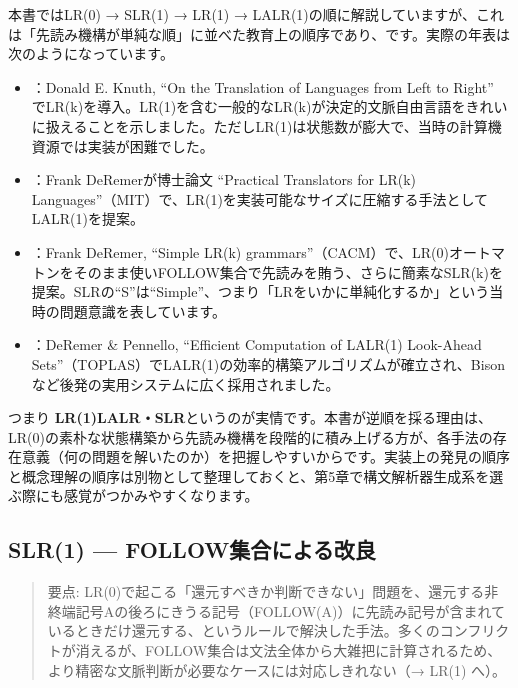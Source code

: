 \begin{tcolorbox}[title=LR系構文解析の歴史]
本書ではLR(0) → SLR(1) → LR(1) → LALR(1)の順に解説していますが、これは「先読み機構が単純な順」に並べた教育上の順序であり、です。実際の年表は次のようになっています。

\begin{itemize}
\item
  \textbf{}：Donald E. Knuth, ``On the Translation of Languages from Left to Right'' でLR(k)を導入。LR(1)を含む一般的なLR(k)が決定的文脈自由言語をきれいに扱えることを示しました。ただしLR(1)は状態数が膨大で、当時の計算機資源では実装が困難でした。
\item
  \textbf{}：Frank DeRemerが博士論文 ``Practical Translators for LR(k) Languages''（MIT）で、LR(1)を実装可能なサイズに圧縮する手法としてLALR(1)を提案。
\item
  \textbf{}：Frank DeRemer, ``Simple LR(k) grammars''（CACM）で、LR(0)オートマトンをそのまま使いFOLLOW集合で先読みを賄う、さらに簡素なSLR(k)を提案。SLRの``S''は``Simple''、つまり「LRをいかに単純化するか」という当時の問題意識を表しています。
\item
  \textbf{}：DeRemer \& Pennello, ``Efficient Computation of LALR(1) Look-Ahead Sets''（TOPLAS）でLALR(1)の効率的構築アルゴリズムが確立され、Bisonなど後発の実用システムに広く採用されました。
\end{itemize}

つまり \textbf{\sffamily LR(1)}\textbf{\sffamily LALR・SLR}というのが実情です。本書が逆順を採る理由は、LR(0)の素朴な状態構築から先読み機構を段階的に積み上げる方が、各手法の存在意義（何の問題を解いたのか）を把握しやすいからです。実装上の発見の順序と概念理解の順序は別物として整理しておくと、第5章で構文解析器生成系を選ぶ際にも感覚がつかみやすくなります。
\end{tcolorbox}

\subsection{SLR(1) --- FOLLOW集合による改良}

\begin{quote}
要点:
LR(0)で起こる「還元すべきか判断できない」問題を、還元する非終端記号Aの後ろにきうる記号（FOLLOW(A)）に先読み記号が含まれているときだけ還元する、というルールで解決した手法。多くのコンフリクトが消えるが、FOLLOW集合は文法全体から大雑把に計算されるため、より精密な文脈判断が必要なケースには対応しきれない（→
LR(1) へ）。\enlargethispage{\baselineskip}
\end{quote}

